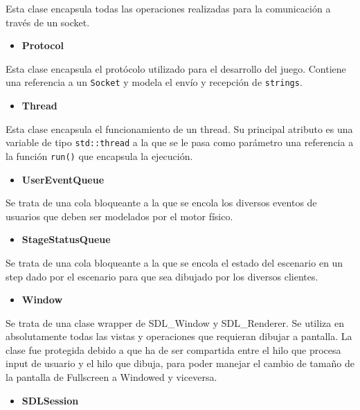 \documentclass[a4paper]{article}
\begin{document}
Esta clase encapsula todas las operaciones realizadas para la comunicación a través de un socket.

\begin{itemize}
	\item \textbf{Protocol}
\end{itemize}

Esta clase encapsula el protócolo utilizado para el desarrollo del juego. Contiene una referencia a un \texttt{Socket} y modela el envío y recepción de \texttt{strings}.

\begin{itemize}
	\item \textbf{Thread}
\end{itemize}

Esta clase encapsula el funcionamiento de un thread. Su principal atributo es una variable de tipo \texttt{std::thread} a la que se le pasa como parámetro una
referencia a la función \texttt{run()} que encapsula la ejecución.

\begin{itemize}
	\item \textbf{UserEventQueue}
\end{itemize}

Se trata de una cola bloqueante a la que se encola los diversos eventos de usuarios que deben ser modelados por el motor físico.

\begin{itemize}
	\item \textbf{StageStatusQueue}
\end{itemize}

Se trata de una cola bloqueante a la que se encola el estado del escenario en un step dado por el escenario para que sea dibujado por los diversos clientes.

\begin{itemize}
	\item \textbf{Window}
\end{itemize}

Se trata de una clase wrapper de SDL\_Window y SDL\_Renderer. Se utiliza en absolutamente todas las vistas y operaciones que requieran dibujar a pantalla.
La clase fue protegida debido a que ha de ser compartida entre el hilo que procesa input de usuario y el hilo que dibuja, para poder manejar el cambio de tamaño de la pantalla de Fullscreen a Windowed y viceversa.

\begin{itemize}
	\item \textbf{SDLSession}
\end{itemize}
\end{document}
